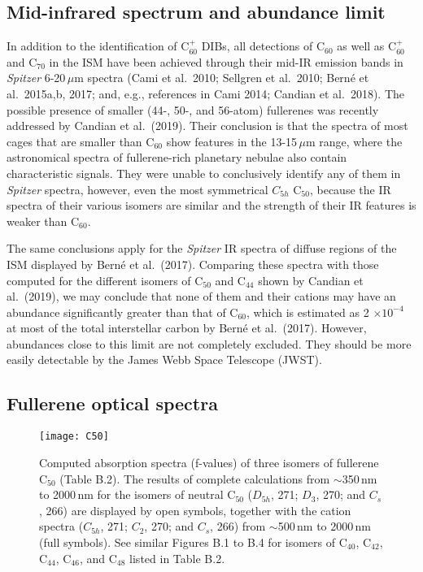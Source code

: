 \documentclass{aa}
\begin{document}
\subsection{Mid-infrared spectrum and abundance limit}

In addition to the identification of  C$_{60}^+$ DIBs,  all detections of C$_{60}$ as well as  C$_{60}^+$  and  C$_{70}$ in the ISM have  been achieved 
through their mid-IR emission bands in {\it Spitzer} 6-20\,$\mu$m spectra 
(Cami et al.\ 2010; Sellgren et al.\ 2010; Bern\'e et al.\ 2015a,b, 2017; 
and, e.g., references in Cami 2014; Candian et al.\ 2018). The possible presence of smaller (44-, 50-, and 56-atom) fullerenes 
was recently addressed by Candian et al.\ (2019). Their conclusion is that the spectra of most cages that
are smaller than C$_{60}$  show features in the 13-15\,$\mu$m range, where the astronomical spectra of fullerene-rich planetary nebulae also contain characteristic signals. They were unable to conclusively identify any of them in {\it Spitzer} spectra, however, even the most symmetrical $C_{5h}$ C$_{50}$, because the IR spectra of their various isomers are similar and the strength of their IR features is weaker than C$_{60}$.

The same conclusions apply for the {\it Spitzer} IR spectra of diffuse regions of the ISM displayed by Bern\'e  et al.\ (2017). Comparing these spectra with those computed for the different isomers of C$_{50}$ and C$_{44}$ shown by Candian et al.\ (2019), we may conclude that none of them and their cations may have an abundance significantly greater than that of C$_{60}$, which is estimated as 2 $\times 10^{-4}$ at most of the total 
interstellar carbon by Bern\'e  et al.\ (2017). However, abundances close 
to this limit are not completely excluded. They should be more easily detectable by the James Webb Space Telescope (JWST). 

\subsection{Fullerene optical spectra }

\begin{figure}[htbp]
         \begin{center}
\texttt{[image: C50]}
 \caption{Computed absorption spectra (f-values) of three isomers of  fullerene C$_{50}$ (Table B.2).
The results of complete calculations from $\sim$350\,nm to 2000\,nm for the isomers of neutral C$_{50}$ ($D_{5h}$, 271; $D_3$, 270; and $C_s$, 266) are displayed by open symbols, together with the cation spectra ($C_{5h}$, 271; $C_2$, 270; and $C_s$, 266) from $\sim$500\,nm to 2000\,nm (full symbols).
See similar Figures B.1 to B.4 for isomers of C$_{40}$, C$_{42}$, C$_{44}$, C$_{46}$, and C$_{48}$ listed in Table B.2.}
     \end{center}
 \end{figure}
\end{document}
